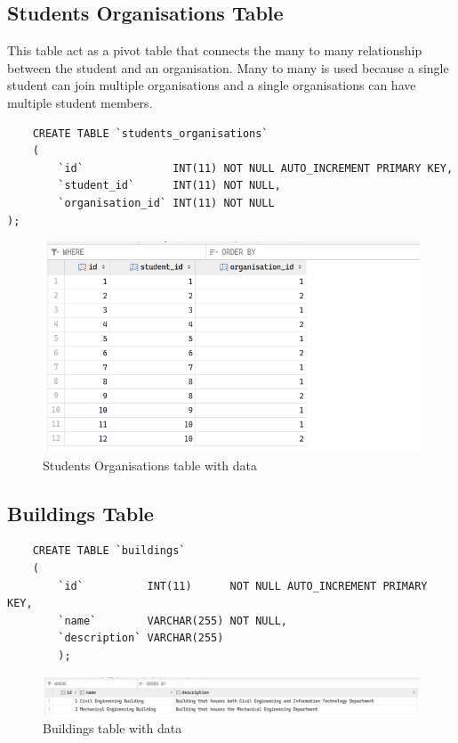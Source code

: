 \documentclass[12pt,titlepage]{article}
\begin{document}
\subsection{Students Organisations Table}
This table act as a pivot table that connects the many to many relationship between the student and an organisation.
Many to many is used because a single student can join multiple organisations and a single organisations can have multiple student members.

\begin{verbatim}
    CREATE TABLE `students_organisations`
    (
        `id`              INT(11) NOT NULL AUTO_INCREMENT PRIMARY KEY,
        `student_id`      INT(11) NOT NULL,
        `organisation_id` INT(11) NOT NULL
);
\end{verbatim}

\begin{figure}[h]
    \centering
    \includegraphics[width=\textwidth]{./images/students-organisations-table.png}
    \caption{Students Organisations table with data}
\end{figure}

\subsection{Buildings Table}
\begin{verbatim}
    CREATE TABLE `buildings`
    (
        `id`          INT(11)      NOT NULL AUTO_INCREMENT PRIMARY KEY,
        `name`        VARCHAR(255) NOT NULL,
        `description` VARCHAR(255)
        );
    \end{verbatim}
    
    \begin{figure}[h]
        \centering
        \includegraphics[width=\textwidth]{./images/buildings-table.png}
        \caption{Buildings table with data}
    \end{figure}
    
\end{document}
